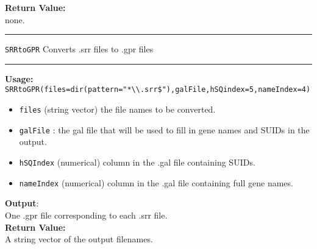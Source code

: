 \documentclass[10pt]{article}
\begin{document}
     \textbf{Return Value:}\\ none.
 \\
  \rule{\linewidth}{0.4pt}
  \texttt{SRRtoGPR} \hspace{1in} Converts .srr files to .gpr files\\
    \rule{\linewidth}{0.4pt}
\textbf{Usage:}\\
\texttt{SRRtoGPR(files=dir(pattern="*\textbackslash\textbackslash.srr\$"),galFile,hSQindex=5,nameIndex=4)}
\begin{itemize}
     	\item \texttt{files} (string vector) the file names to be converted. 
     	\item \texttt{galFile} : the gal file that will be used to fill in gene names and SUIDs in the output. 
      	\item \texttt{hSQIndex} (numerical) column in the .gal file containing SUIDs. 
      	\item \texttt{nameIndex} (numerical) column in the .gal file containing full gene names.
   \end{itemize}

\textbf{Output}:\\
One .gpr file corresponding to each .srr file.\\
 \textbf{Return Value:}\\ 
 A string vector of the output filenames.
\end{document}
